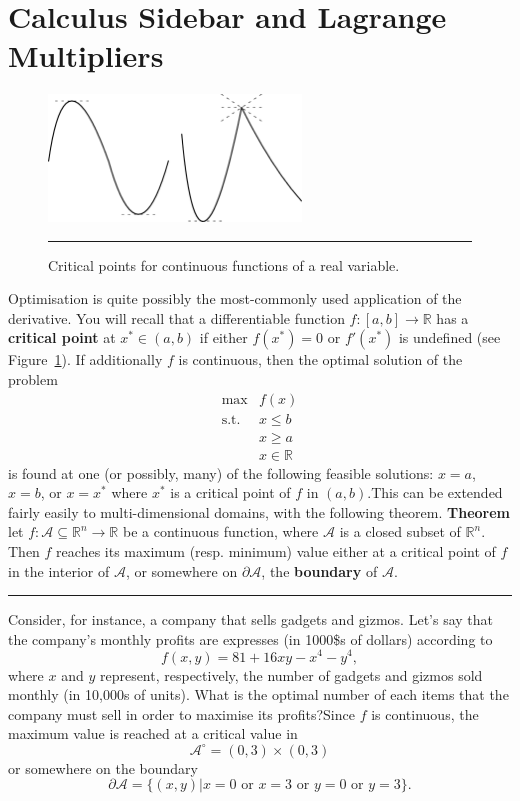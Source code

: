 \section{Calculus Sidebar and Lagrange Multipliers}
\begin{figure}[!t]
\centering
\includegraphics[width=0.6\textwidth]{Images/extrema.png}
\caption[\small Critical points for continuous functions of a real variable]{\small Critical points for continuous functions of a real variable.}\hrule\label{fig:extrema}
\end{figure}
Optimisation is quite possibly the most-commonly used application of the derivative. You will recall that a differentiable function $f:[a,b]\to \mathbb{R}$ has a \textbf{critical point} at $x^*\in (a,b)$ if either $f(x^*)=0$ or $f'(x^*)$ is undefined (see Figure~\ref{fig:extrema}). If additionally $f$ is continuous, then the optimal solution of the problem
\[\begin{array}{rl}
\max & f(x) \\
\mbox{s.t.} & x\leq b \\ 
 & x\geq a \\ 
&x \in \mathbb{R}
\end{array}\]
is found at one (or possibly, many) of the following feasible solutions: $x=a$, $x=b$, or $x=x^*$ where $x^*$ is a critical point of $f$ in $(a,b)$.\newl This can be extended fairly easily to multi-dimensional domains, with the following theorem. 
\newl \textbf{Theorem} let $f:\mathcal{A}\subseteq \mathbb{R}^n\to \mathbb{R}$ be a continuous function, where $\mathcal{A}$ is a closed subset of $\mathbb{R}^n$. Then $f$ reaches its maximum (resp. minimum) value either at a critical point of $f$ in the interior of $\mathcal{A}$, or somewhere on $\partial\!\!\mathcal{A}$, the \textbf{boundary} of $\mathcal{A}$. 
\begin{center}\rule{0.5\linewidth}{.4pt}\end{center}
Consider, for instance, a company that sells gadgets and gizmos. Let's say that the company's monthly profits are expresses (in 1000\$s of dollars) according to $$f(x,y)=81+16xy-x^4-y^4, $$ where $x$ and $y$ represent, respectively, the number of gadgets and gizmos sold monthly (in 10,000s of units). What is the optimal number of each items that the company must sell in order to maximise its profits?\newl Since $f$ is continuous, the maximum value is reached at a critical value in $$\mathcal{A}^{\circ}=(0,3)\times (0,3)$$ or somewhere on the boundary $$\partial\!\!\mathcal{A}=\{(x,y)|x=0 \mbox{ or }x=3\mbox{ or }y=0\mbox{ or }y=3\}.$$
